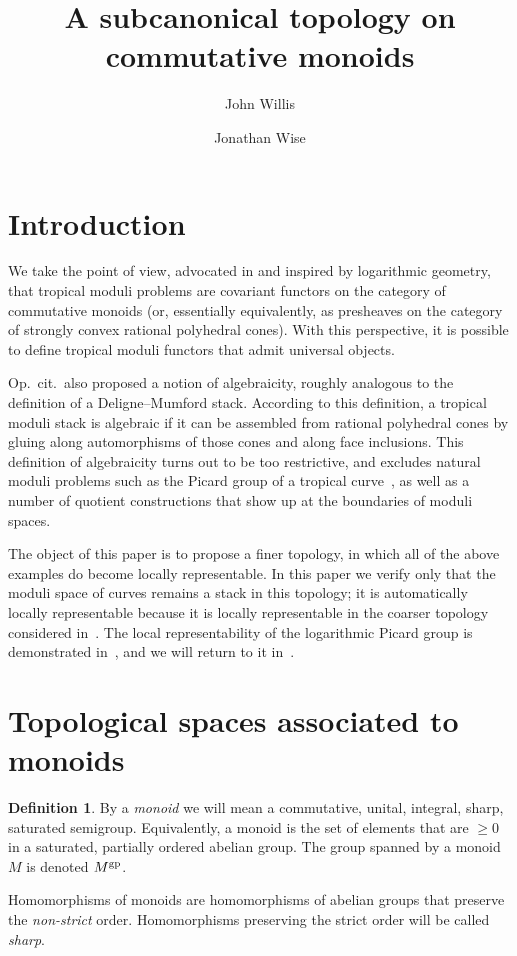 \documentclass[12pt]{amsart}
\author{John Willis}
\author{Jonathan Wise}
\title{A subcanonical topology on commutative monoids}
\theoremstyle{definition}
\newtheorem{definition}[theorem]{Definition}
\theoremstyle{remark}
\begin{document}
\maketitle

\section{Introduction}

We take the point of view, advocated in \cite{CCUW} and inspired by logarithmic geometry, that tropical moduli problems are covariant functors on the category of commutative monoids (or, essentially equivalently, as presheaves on the category of strongly convex rational polyhedral cones).  With this perspective, it is possible to define tropical moduli functors that admit universal objects. 

Op.\ cit.\ also proposed a notion of algebraicity, roughly analogous to the definition of a Deligne--Mumford stack.  According to this definition, a tropical moduli stack is algebraic if it can be assembled from rational polyhedral cones by gluing along automorphisms of those cones and along face inclusions.  This definition of algebraicity turns out to be too restrictive, and excludes natural moduli problems such as the Picard group of a tropical curve~\cite{logpic}, as well as a number of quotient constructions that show up at the boundaries of moduli spaces.  

The object of this paper is to propose a finer topology, in which all of the above examples do become locally representable.  In this paper we verify only that the moduli space of curves remains a stack in this topology; it is automatically locally representable because it is locally representable in the coarser topology considered in~\cite{CCUW}.  The local representability of the logarithmic Picard group is demonstrated in~\cite{logpic}, and we will return to it in~\cite{criteria}.  

\section{Topological spaces associated to monoids}

\begin{definition} \label{def:monoid}
By a \emph{monoid} we will mean a commutative, unital, integral, sharp, saturated semigroup.  Equivalently, a monoid is the set of elements that are $\geq 0$ in a saturated, partially ordered abelian group.  The group spanned by a monoid $M$ is denoted $M^{\rm gp}$.

Homomorphisms of monoids are homomorphisms of abelian groups that preserve the \emph{non-strict} order.  Homomorphisms preserving the strict order will be called \emph{sharp}.
\end{definition}
\end{document}
